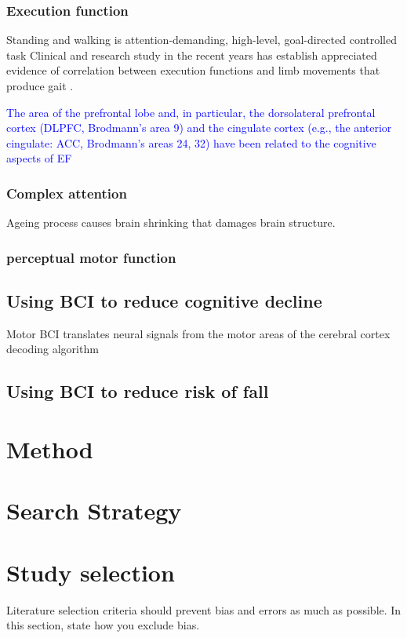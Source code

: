 \documentclass[conference,compsoc]{IEEEtran}
\begin{document}
\subsubsection{Execution function}
Standing and walking is attention-demanding, high-level, goal-directed controlled task
Clinical and research study in the recent years has establish appreciated evidence of correlation between execution functions and limb movements that produce gait \cite{Yogev_Seligmann_2007}.


\textcolor{blue}{The area of the prefrontal
lobe and, in particular, the dorsolateral prefrontal cortex
(DLPFC, Brodmann’s area 9) and the cingulate cortex
(e.g., the anterior cingulate: ACC, Brodmann’s areas 24,
32) have been related to the cognitive aspects of EF \cite{Yogev_Seligmann_2007}}

\subsubsection{Complex attention}
Ageing process causes brain shrinking that damages brain structure.
\subsubsection{perceptual motor function}

\subsection{Using BCI to reduce cognitive decline}
Motor BCI translates neural signals from the motor areas of the cerebral cortex decoding algorithm

\subsection{Using BCI to reduce risk of fall}

\section{Method}
\section{Search Strategy}
\section{Study selection}
Literature selection criteria should prevent bias and errors as much as possible. In this section, state how you exclude bias.
\end{document}
